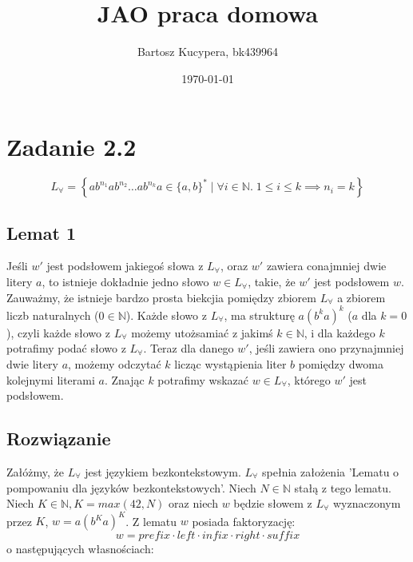\documentclass{article}
\title{JAO praca domowa}
\author{Bartosz Kucypera, bk439964}
\date{\today}
\begin{document}
\maketitle

\section*{Zadanie 2.2} 

$$ L_{\forall} = \displaystyle \left\{ab^{n_1}ab^{n_2} \dots ab^{n_{k}}a \in \{a, b\}^* \; | \; \forall i \in \mathbb{N}.\; 1 \le i \le k \implies n_i = k\right\}$$

\subsection*{Lemat 1}
Jeśli $w'$ jest podsłowem jakiegoś słowa z $L_{\forall}$, oraz $w'$ zawiera conajmniej dwie litery $a$, to istnieje dokładnie jedno słowo $w \in L_{\forall}$, takie, że $w'$ jest podsłowem $w$. \newline \newline
Zauważmy, że istnieje bardzo prosta biekcjia pomiędzy zbiorem $L_{\forall}$ a zbiorem liczb naturalnych ($0 \in \mathbb{N}$). \newline
Każde słowo z $L_{\forall}$, ma strukturę $a(b^ka)^k$ ($a$ dla $k=0$), czyli każde słowo z $L_{\forall}$ możemy utożsamiać z jakimś $k \in \mathbb{N}$, i dla każdego $k$ potrafimy podać słowo z $L_{\forall}$. Teraz dla danego $w'$, jeśli zawiera ono przynajmniej dwie litery $a$, możemy odczytać $k$ licząc wystąpienia liter $b$ pomiędzy dwoma kolejnymi literami $a$. Znając $k$ potrafimy wskazać $w \in L_{\forall}$, którego $w'$ jest podsłowem.

\subsection*{Rozwiązanie}
Załóżmy, że $L_{\forall}$ jest językiem bezkontekstowym. \newline 
$L_{\forall}$ spełnia założenia 'Lematu o pompowaniu dla języków bezkontekstowych'. \newline 
Niech $N \in \mathbb{N}$ stałą z tego lematu. \newline
Niech $K \in \mathbb{N}, K=max(42, N)$ oraz niech $w$ będzie słowem z $L_{\forall}$ wyznaczonym przez $K$, $w=a(b^Ka)^K$.\newline 
Z lematu $w$ posiada faktoryzację: 
$$w = prefix  \cdot left \cdot infix \cdot right \cdot suffix$$
o następujących własnościach:
\end{document}
